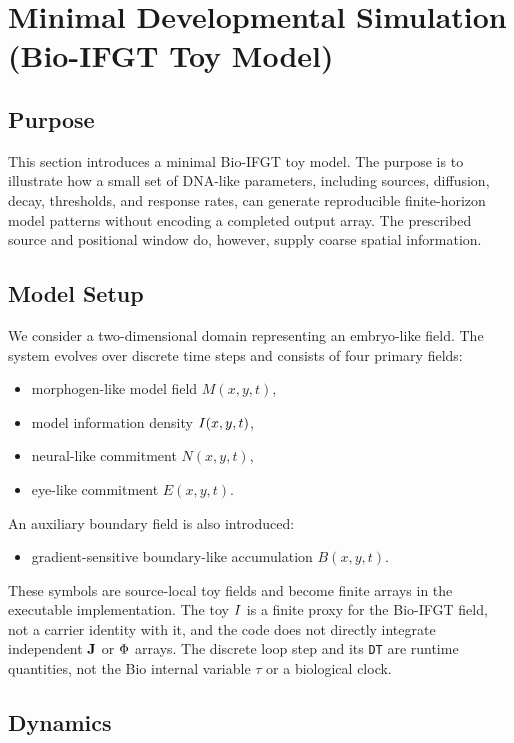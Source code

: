 \section{Minimal Developmental Simulation (Bio-IFGT Toy Model)}

\subsection{Purpose}

This section introduces a minimal Bio-IFGT toy model. The purpose is to illustrate how a small set of DNA-like parameters, including sources, diffusion, decay, thresholds, and response rates, can generate reproducible finite-horizon model patterns without encoding a completed output array. The prescribed source and positional window do, however, supply coarse spatial information.

\subsection{Model Setup}

We consider a two-dimensional domain representing an embryo-like field. The system evolves over discrete time steps and consists of four primary fields:
\begin{itemize}
  \item morphogen-like model field \(M(x,y,t)\),
  \item model information density \(I(x,y,t)\),
  \item neural-like commitment \(N(x,y,t)\),
  \item eye-like commitment \(E(x,y,t)\).
\end{itemize}

An auxiliary boundary field is also introduced:
\begin{itemize}
  \item gradient-sensitive boundary-like accumulation \(B(x,y,t)\).
\end{itemize}
These symbols are source-local toy fields and become finite arrays in the executable implementation. The toy \(I\) is a finite proxy for the Bio-IFGT field, not a carrier identity with it, and the code does not directly integrate independent \(\mathbf{J}\) or \(\Phi\) arrays. The discrete loop step and its \texttt{DT} are runtime quantities, not the Bio internal variable \(\tau\) or a biological clock.

\subsection{Dynamics}

